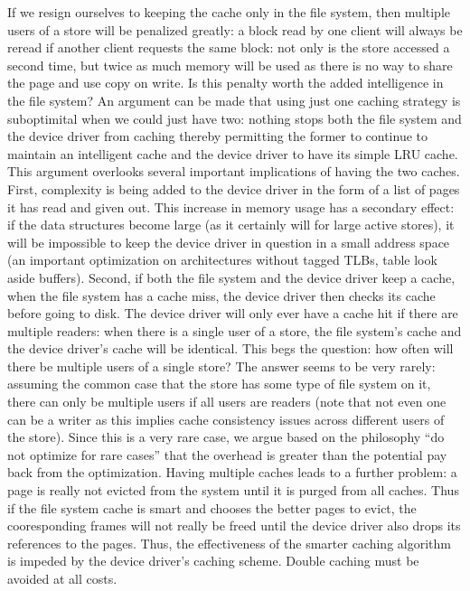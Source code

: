 If we resign ourselves to keeping the cache only in the file system,
then multiple users of a store will be penalized greatly: a block read
by one client will always be reread if another client requests the
same block: not only is the store accessed a second time, but twice as
much memory will be used as there is no way to share the page and use
copy on write.  Is this penalty worth the added intelligence in the
file system?  An argument can be made that using just one caching
strategy is suboptimital when we could just have two: nothing stops
both the file system and the device driver from caching thereby
permitting the former to continue to maintain an intelligent cache and
the device driver to have its simple LRU cache.  This argument
overlooks several important implications of having the two caches.
First, complexity is being added to the device driver in the form of a
list of pages it has read and given out.  This increase in memory
usage has a secondary effect: if the data structures become large (as
it certainly will for large active stores), it will be impossible to
keep the device driver in question in a small address space (an
important optimization on architectures without tagged TLBs, table
look aside buffers).  Second, if both the file system and the device
driver keep a cache, when the file system has a cache miss, the device
driver then checks its cache before going to disk.  The device driver
will only ever have a cache hit if there are multiple readers: when
there is a single user of a store, the file system's cache and the
device driver's cache will be identical.  This begs the question: how
often will there be multiple users of a single store?  The answer
seems to be very rarely: assuming the common case that the store has
some type of file system on it, there can only be multiple users if
all users are readers (note that not even one can be a writer as this
implies cache consistency issues across different users of the store).
Since this is a very rare case, we argue based on the philosophy ``do
not optimize for rare cases'' that the overhead is greater than the
potential pay back from the optimization.  Having multiple caches
leads to a further problem: a page is really not evicted from the
system until it is purged from all caches.  Thus if the file system
cache is smart and chooses the better pages to evict, the
cooresponding frames will not really be freed until the device driver
also drops its references to the pages.  Thus, the effectiveness of
the smarter caching algorithm is impeded by the device driver's
caching scheme.  Double caching must be avoided at all costs.

